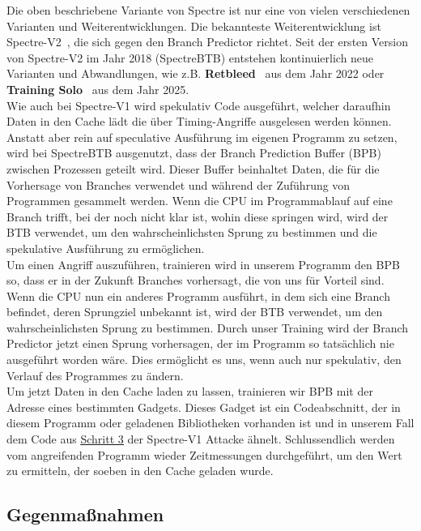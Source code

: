 Die oben beschriebene Variante von Spectre ist nur eine von vielen verschiedenen Varianten und Weiterentwicklungen.
Die bekannteste Weiterentwicklung ist Spectre-V2~\cite{spec_v2}, die sich gegen den Branch Predictor richtet.
Seit der ersten Version von Spectre-V2 im Jahr 2018 (SpectreBTB) entstehen kontinuierlich neue Varianten und Abwandlungen, wie z.B. \textbf{Retbleed}~\cite{spec_v2_retbleed} aus dem Jahr 2022 oder \textbf{Training Solo}~\cite{training_solo} aus dem Jahr 2025. \\
Wie auch bei Spectre-V1 wird spekulativ Code ausgeführt, welcher daraufhin Daten in den Cache lädt die über Timing-Angriffe ausgelesen werden können.
Anstatt aber rein auf speculative Ausführung im eigenen Programm zu setzen, wird bei SpectreBTB ausgenutzt, dass der Branch Prediction Buffer (BPB) zwischen Prozessen geteilt wird.
Dieser Buffer beinhaltet Daten, die für die Vorhersage von Branches verwendet und während der Zuführung von Programmen gesammelt werden.
Wenn die CPU im Programmablauf auf eine Branch trifft, bei der noch nicht klar ist, wohin diese springen wird, wird der BTB verwendet, um den wahrscheinlichsten Sprung zu bestimmen und die spekulative Ausführung zu ermöglichen. \\
Um einen Angriff auszuführen, trainieren wird in unserem Programm den BPB so, dass er in der Zukunft Branches vorhersagt, die von uns für Vorteil sind.
Wenn die CPU nun ein anderes Programm ausführt, in dem sich eine Branch befindet, deren Sprungziel unbekannt ist, wird der BTB verwendet, um den wahrscheinlichsten Sprung zu bestimmen.
Durch unser Training wird der Branch Predictor jetzt einen Sprung vorhersagen, der im Programm so tatsächlich nie ausgeführt worden wäre.
Dies ermöglicht es uns, wenn auch nur spekulativ, den Verlauf des Programmes zu ändern. \\
Um jetzt Daten in den Cache laden zu lassen, trainieren wir BPB mit der Adresse eines bestimmten Gadgets.
Dieses Gadget ist ein Codeabschnitt, der in diesem Programm oder geladenen Bibliotheken vorhanden ist und in unserem Fall dem Code aus \hyperref[itm:spectre_step3_code]{\underline{Schritt 3}} der Spectre-V1 Attacke ähnelt.
Schlussendlich werden vom angreifenden Programm wieder Zeitmessungen durchgeführt, um den Wert zu ermitteln, der soeben in den Cache geladen wurde.

\subsection{Gegenmaßnahmen}
\label{subsec:spectre_gegenmassnahmen}

